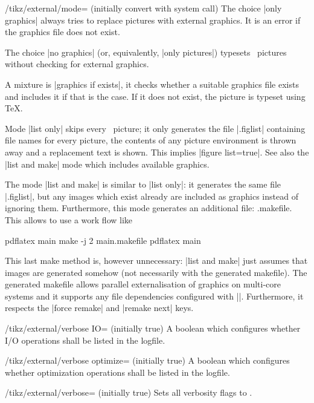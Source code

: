{\begin{key}{/tikz/external/mode= (initially convert with system call)}
	The choice |only graphics| always tries to replace pictures with external graphics. It is an error if the graphics file does not exist.

	The choice |no graphics| (or, equivalently, |only pictures|) typesets \tikzname\ pictures without checking for external graphics.

	A mixture is |graphics if exists|, it checks whether a suitable graphics file exists and includes it if that is the case. If it does not exist, the picture is typeset using \TeX.

	Mode |list only| skips every \tikzname\ picture; it only generates the file |.figlist| containing file names for every picture, the contents of any picture environment is thrown away and a replacement text is shown. This implies |figure list=true|. See also the |list and make| mode which includes available graphics.

	The mode |list and make| is similar to |list only|: it generates the same file |.figlist|, but any images which exist already are included as graphics instead of ignoring them. Furthermore, this mode generates an additional file: .makefile. This allows to use a work flow like
\begin{codeexample}
pdflatex main
make -j 2 main.makefile
pdflatex main
\end{codeexample}
	\noindent This last make method is, however unnecessary: |list and make| just assumes that images are generated somehow (not necessarily with the generated makefile). The generated makefile allows parallel externalisation of graphics on multi-core systems and it supports any file dependencies configured with |\tikzpicturedependsonfile|. Furthermore, it respects the |force remake| and |remake next| keys.


\end{key}


\begin{key}{/tikz/external/verbose IO= (initially true)}
	A boolean which configures whether I/O operations shall be listed in the logfile.
\end{key}
\begin{key}{/tikz/external/verbose optimize= (initially true)}
	A boolean which configures whether optimization operations shall be listed in the logfile.
\end{key}
\begin{key}{/tikz/external/verbose= (initially true)}
	Sets all verbosity flags to .
\end{key}

}
